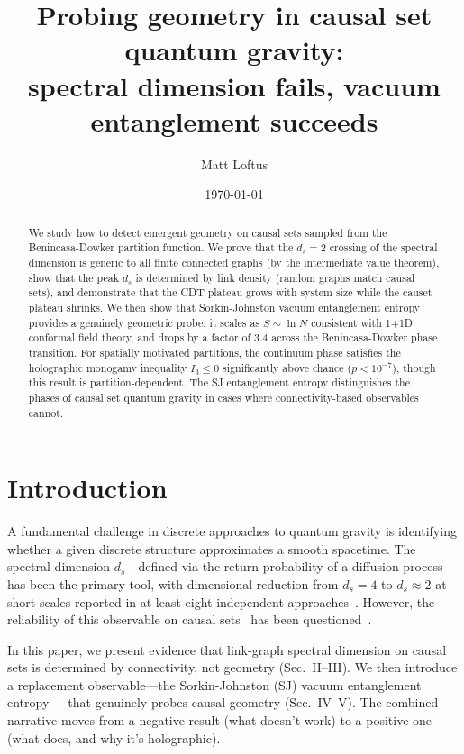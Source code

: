 \documentclass[aps,prd,twocolumn,superscriptaddress,nofootinbib]{revtex4-2}
\begin{document}
\title{Probing geometry in causal set quantum gravity:\\spectral dimension fails, vacuum entanglement succeeds}

\author{Matt Loftus}

\date{\today}

\begin{abstract}
We study how to detect emergent geometry on causal sets sampled from the Benincasa-Dowker partition function. We prove that the $d_s = 2$ crossing of the spectral dimension is generic to all finite connected graphs (by the intermediate value theorem), show that the peak $d_s$ is determined by link density (random graphs match causal sets), and demonstrate that the CDT plateau grows with system size while the causet plateau shrinks. We then show that Sorkin-Johnston vacuum entanglement entropy provides a genuinely geometric probe: it scales as $S \sim \ln N$ consistent with 1+1D conformal field theory, and drops by a factor of $3.4$ across the Benincasa-Dowker phase transition. For spatially motivated partitions, the continuum phase satisfies the holographic monogamy inequality $I_3 \leq 0$ significantly above chance ($p < 10^{-7}$), though this result is partition-dependent. The SJ entanglement entropy distinguishes the phases of causal set quantum gravity in cases where connectivity-based observables cannot.
\end{abstract}

\maketitle

\section{Introduction}

A fundamental challenge in discrete approaches to quantum gravity is identifying whether a given discrete structure approximates a smooth spacetime. The spectral dimension $d_s$---defined via the return probability of a diffusion process---has been the primary tool, with dimensional reduction from $d_s = 4$ to $d_s \approx 2$ at short scales reported in at least eight independent approaches~\cite{carlip2017}. However, the reliability of this observable on causal sets~\cite{bombelli1987,surya2019} has been questioned~\cite{eichhorn2014,eichhorn2019}.

In this paper, we present evidence that link-graph spectral dimension on causal sets is determined by connectivity, not geometry (Sec.~II--III). We then introduce a replacement observable---the Sorkin-Johnston (SJ) vacuum entanglement entropy~\cite{johnston2009,sorkin2012}---that genuinely probes causal geometry (Sec.~IV--V). The combined narrative moves from a negative result (what doesn't work) to a positive one (what does, and why it's holographic).
\end{document}
